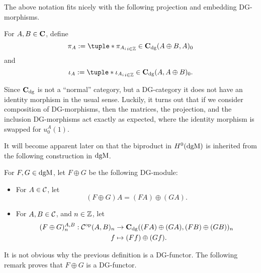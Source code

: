 The above notation fits nicely with the following projection and embedding DG-morphisms.
\begin{definition}
    For \( A, B \in \operatorname{\mathbf{C}} \), define
    \[
        \pi_A := \tuple*{\pi_{A_i}}_{i \in \Zb} \in \C_{\dg}(A \oplus B, A)_0
    \]
    and
    \[
        \iota_A := \tuple*{\iota_{A_i}}_{i \in \Zb} \in \C_{\dg}(A, A \oplus B)_0.
    \]
\end{definition}

Since \( \operatorname{\mathbf{C}}_{\operatorname{dg}} \) is not a ``normal'' category, but a DG-category it does not have an identity morphism in the usual sense. Luckily, it turns out that if we consider composition of DG-morphisms, then the matrices, the projection, and the inclusion DG-morphisms act exactly as expected, where the identity morphism is swapped for \( u_0^A(1) \).

It will become apparent later on that the biproduct in \( H^0(\operatorname{dgM}) \) is inherited from the following construction in \( \operatorname{dgM} \).

\begin{definition}
    \label{def:dgm_biproduct}
    For \( F, G \in \operatorname{dgM} \), let \( F \oplus G \) be the following DG-module:
    \begin{itemize}
        \item {
            For \( A \in {\mathcal{C}} \), let
            \[
                (F \oplus G) A = (F A) \oplus (G A).
            \]
        }
        \item {
            For \( A, B \in {\mathcal{C}} \), and \( n \in {\mathbb{Z}} \), let
            \begin{align*}
                (F \oplus G)_n^{A, B}: {\mathcal{C}}^{\operatorname{op}}(A, B)_n &\to \operatorname{\mathbf{C}}_{\operatorname{dg}}((F A) \oplus (G A), (F B) \oplus (G B))_n \\
                f &\mapsto (F f) \oplus (G f).
            \end{align*}
        }
    \end{itemize}
\end{definition}

It is not obvious why the previous definition is a DG-functor. The following remark proves that \( F \oplus G \) is a DG-functor.

